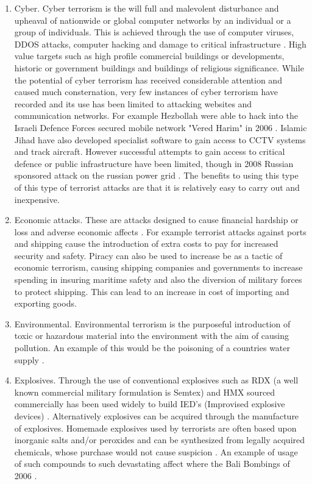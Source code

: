 \begin{enumerate}
\item Cyber. Cyber terrorism is the will full and malevolent disturbance and upheaval of nationwide or global computer networks by an individual or a group of individuals. This is achieved through the use of computer viruses, DDOS attacks, computer hacking and damage to critical infrastructure \citep{Golandsky2016}. High value targets  such as high profile commercial buildings or developments, historic or government buildings and buildings of religious significance. While the potential of cyber terrorism has received considerable attention and caused much consternation, very few instances of cyber terrorism have recorded and its use has been limited to attacking websites and communication networks. For example Hezbollah were able to hack into the Israeli Defence Forces secured mobile network "Vered Harim" in 2006 \citep{Golandsky2016}. Islamic Jihad have also developed specialist software to gain access to CCTV systems and track aircraft. However successful attempts to gain access to critical defence or public infrastructure have been limited, though in 2008 Russian sponsored attack on the russian power grid \citep{Cybersecurity2016Perez}. The benefits to using this type of this type of terrorist attacks are that it is relatively easy to carry out and inexpensive. 
\item Economic attacks. These are attacks designed to cause financial hardship or loss and adverse economic affects \citep{drake1998role}. For example terrorist attacks against ports and shipping cause the introduction of extra costs to pay for increased security and safety. Piracy can also be used to increase be as a tactic of economic terrorism, causing shipping companies and governments to increase spending in insuring maritime safety and also the diversion of military forces to protect shipping. This can lead to an increase in cost of importing and exporting goods. 
\item Environmental. Environmental terrorism is the purposeful introduction of toxic or hazardous material into the environment with the aim of causing pollution. An example of this would be the poisoning of a countries water supply \citep{gleick2006water}.
\item Explosives. Through the use of conventional explosives such as RDX (a well known commercial military formulation is Semtex) and HMX sourced commercially has been used widely to build IED's (Improvised explosive devices) \citep{kopp2008technology}. Alternatively explosives can be acquired through the manufacture of explosives. Homemade explosives used by terrorists are often based upon inorganic salts and/or peroxides and can be synthesized from legally acquired  chemicals, whose purchase would not cause suspicion \citep{johns2008identification}.  An example of usage of such compounds to such devastating affect where the Bali Bombings of 2006 \citep{royds2005case}.

\end{enumerate}
